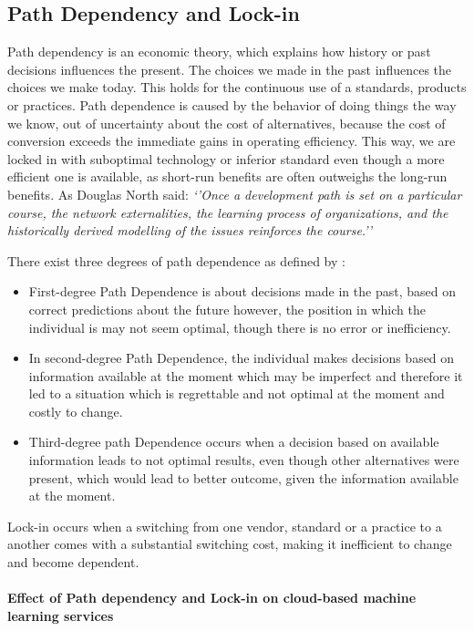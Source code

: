 \subsection{Path Dependency and Lock-in} \label{sec:path-depenency}
Path dependency is an economic theory, which explains how history or past decisions influences the present. The choices we made in the past influences the choices we make today. This holds for the continuous use of a standards, products or practices. Path dependence is caused by the behavior of doing things the way we know, out of uncertainty about the cost of alternatives, because the cost of conversion exceeds the immediate gains in operating efficiency. This way, we are locked in with suboptimal technology or inferior standard even though a more efficient one is available, as short-run benefits are often outweighs the long-run benefits. As Douglas North said: \textit{‘’Once a development path is set on a particular course, the network externalities, the learning process of organizations, and the historically derived modelling of the issues reinforces the course.’’}

There exist three degrees of path dependence as defined by \cite{Liebowitz2001WinnersTechnology}:
\begin{itemize}[noitemsep]
    \item First-degree Path Dependence is about decisions made in the past, based on correct predictions about the future however, the position in which the individual is may not seem optimal, though there is no error or inefficiency.
    \item In second-degree Path Dependence, the individual makes decisions based on information available at the moment which may be imperfect and therefore it led to a situation which is regrettable and not optimal at the moment and costly to change.
    \item Third-degree path Dependence occurs when a decision based on available information leads to not optimal results, even though other alternatives were present, which would lead to better outcome, given the information available at the moment.
\end{itemize}
  
Lock-in occurs when a switching from one vendor, standard or a practice to a another comes with a substantial switching cost, making it inefficient to change and become dependent.

\paragraph{Effect of Path dependency and Lock-in on cloud-based machine learning services}


